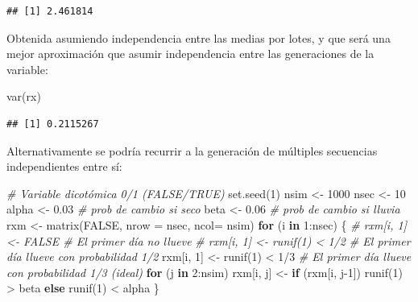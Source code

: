 \documentclass[
]{book}
\newenvironment{Shaded}{\begin{snugshade}}{\end{snugshade}}
\newcommand{\AttributeTok}[1]{\textcolor[rgb]{0.77,0.63,0.00}{#1}}
\newcommand{\CommentTok}[1]{\textcolor[rgb]{0.56,0.35,0.01}{\textit{#1}}}
\newcommand{\ConstantTok}[1]{\textcolor[rgb]{0.00,0.00,0.00}{#1}}
\newcommand{\ControlFlowTok}[1]{\textcolor[rgb]{0.13,0.29,0.53}{\textbf{#1}}}
\newcommand{\DecValTok}[1]{\textcolor[rgb]{0.00,0.00,0.81}{#1}}
\newcommand{\FloatTok}[1]{\textcolor[rgb]{0.00,0.00,0.81}{#1}}
\newcommand{\FunctionTok}[1]{\textcolor[rgb]{0.00,0.00,0.00}{#1}}
\newcommand{\NormalTok}[1]{#1}
\newcommand{\OtherTok}[1]{\textcolor[rgb]{0.56,0.35,0.01}{#1}}
\newcommand{\SpecialCharTok}[1]{\textcolor[rgb]{0.00,0.00,0.00}{#1}}
\theoremstyle{break}
\theoremstyle{definition}
\theoremstyle{definition}
\theoremstyle{definition}
\theoremstyle{definition}
\theoremstyle{remark}
\begin{document}
\begin{verbatim}
## [1] 2.461814
\end{verbatim}

Obtenida asumiendo independencia entre las medias por lotes, y que será
una mejor aproximación que asumir independencia entre las generaciones
de la variable:

\begin{Shaded}
\begin{Highlighting}[]
\FunctionTok{var}\NormalTok{(rx)}
\end{Highlighting}
\end{Shaded}

\begin{verbatim}
## [1] 0.2115267
\end{verbatim}

Alternativamente se podría recurrir a la generación de múltiples secuencias
independientes entre sí:

\begin{Shaded}
\begin{Highlighting}[]
\CommentTok{\# Variable dicotómica 0/1 (FALSE/TRUE)  }
\FunctionTok{set.seed}\NormalTok{(}\DecValTok{1}\NormalTok{)}
\NormalTok{nsim }\OtherTok{\textless{}{-}} \DecValTok{1000}
\NormalTok{nsec }\OtherTok{\textless{}{-}} \DecValTok{10}
\NormalTok{alpha }\OtherTok{\textless{}{-}} \FloatTok{0.03} \CommentTok{\# prob de cambio si seco}
\NormalTok{beta }\OtherTok{\textless{}{-}} \FloatTok{0.06}  \CommentTok{\# prob de cambio si lluvia}
\NormalTok{rxm }\OtherTok{\textless{}{-}} \FunctionTok{matrix}\NormalTok{(}\ConstantTok{FALSE}\NormalTok{, }\AttributeTok{nrow =}\NormalTok{ nsec, }\AttributeTok{ncol=}\NormalTok{ nsim)}
\ControlFlowTok{for}\NormalTok{ (i }\ControlFlowTok{in} \DecValTok{1}\SpecialCharTok{:}\NormalTok{nsec) \{}
  \CommentTok{\# rxm[i, 1] \textless{}{-} FALSE \# El primer día no llueve}
  \CommentTok{\# rxm[i, 1] \textless{}{-} runif(1) \textless{} 1/2 \# El primer día llueve con probabilidad 1/2}
\NormalTok{  rxm[i, }\DecValTok{1}\NormalTok{] }\OtherTok{\textless{}{-}} \FunctionTok{runif}\NormalTok{(}\DecValTok{1}\NormalTok{) }\SpecialCharTok{\textless{}} \DecValTok{1}\SpecialCharTok{/}\DecValTok{3} \CommentTok{\# El primer día llueve con probabilidad 1/3 (ideal)}
  \ControlFlowTok{for}\NormalTok{ (j }\ControlFlowTok{in} \DecValTok{2}\SpecialCharTok{:}\NormalTok{nsim)}
\NormalTok{    rxm[i, j] }\OtherTok{\textless{}{-}} \ControlFlowTok{if}\NormalTok{ (rxm[i, j}\DecValTok{{-}1}\NormalTok{]) }\FunctionTok{runif}\NormalTok{(}\DecValTok{1}\NormalTok{) }\SpecialCharTok{\textgreater{}}\NormalTok{ beta }\ControlFlowTok{else} \FunctionTok{runif}\NormalTok{(}\DecValTok{1}\NormalTok{) }\SpecialCharTok{\textless{}}\NormalTok{ alpha}
\NormalTok{\}}
\end{Highlighting}
\end{Shaded}
\end{document}
